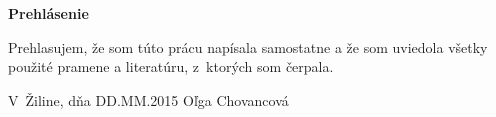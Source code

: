 \newpage

\centerline{\bf Prehlásenie}

\vspace{2em}

\noindent
Prehlasujem, že som túto prácu napísala samostatne a že som uviedola
všetky použité pramene a literatúru, z~ktorých som čerpala. 

\vspace{2em}

\noindent
V~Žiline, dňa DD.MM.2015
\hfill
Oľga Chovancová



